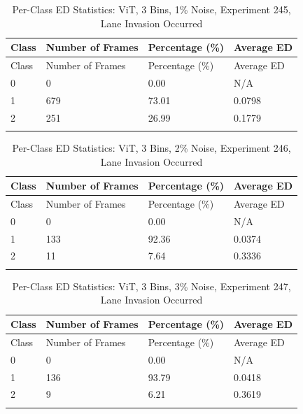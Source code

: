 
\begin{longtable}{@{}llll@{}}
\toprule
Class & Number of Frames & Percentage (\%) & Average ED \\
\midrule
\endfirsthead
\toprule
Class & Number of Frames & Percentage (\%) & Average ED \\
\midrule
\endhead
0 & 0 & 0.00 & N/A \\
1 & 679 & 73.01 & 0.0798 \\
2 & 251 & 26.99 & 0.1779 \\
\bottomrule
\caption{Per-Class ED Statistics: ViT, 3 Bins, 1\% Noise, Experiment 245, Lane Invasion Occurred}
\label{tab:exp245_ViT_3bins_1noise}
\end{longtable}
        


\begin{longtable}{@{}llll@{}}
\toprule
Class & Number of Frames & Percentage (\%) & Average ED \\
\midrule
\endfirsthead
\toprule
Class & Number of Frames & Percentage (\%) & Average ED \\
\midrule
\endhead
0 & 0 & 0.00 & N/A \\
1 & 133 & 92.36 & 0.0374 \\
2 & 11 & 7.64 & 0.3336 \\
\bottomrule
\caption{Per-Class ED Statistics: ViT, 3 Bins, 2\% Noise, Experiment 246, Lane Invasion Occurred}
\label{tab:exp246_ViT_3bins_2noise}
\end{longtable}
        


\begin{longtable}{@{}llll@{}}
\toprule
Class & Number of Frames & Percentage (\%) & Average ED \\
\midrule
\endfirsthead
\toprule
Class & Number of Frames & Percentage (\%) & Average ED \\
\midrule
\endhead
0 & 0 & 0.00 & N/A \\
1 & 136 & 93.79 & 0.0418 \\
2 & 9 & 6.21 & 0.3619 \\
\bottomrule
\caption{Per-Class ED Statistics: ViT, 3 Bins, 3\% Noise, Experiment 247, Lane Invasion Occurred}
\label{tab:exp247_ViT_3bins_3noise}
\end{longtable}
        

